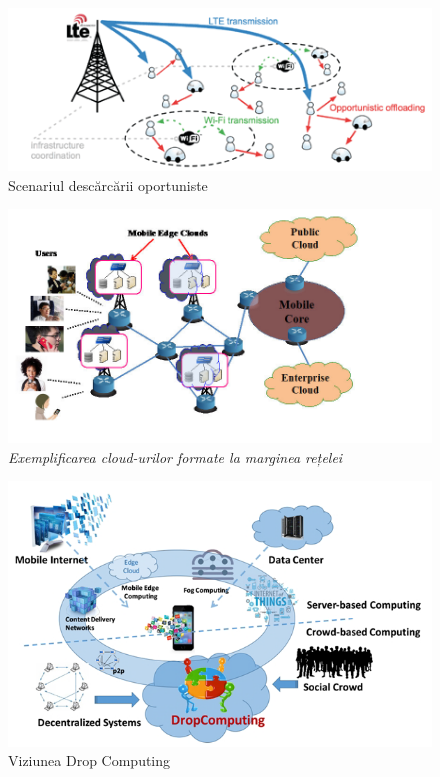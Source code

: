 \documentclass[12pt,a4paper]{report}
\begin{document}
\begin{figure}[th]
\centering
\includegraphics[width=6in]{pics/ONs.png}
  \caption{Scenariul descărcării oportuniste\protect\footnotemark}
  \label{fig:pic1}
\end{figure}

\begin{figure}[th]
\centering
\includegraphics[width=6in]{pics/mobile-edge-computing.jpg}
  \caption{\emph{Exemplificarea cloud-urilor formate la marginea rețelei}\protect\footnotemark}
  \label{fig:pic0}
\end{figure}

\begin{figure}[th]
\centering
\includegraphics[width=6in]{pics/dropComputing.png}
  \caption{Viziunea Drop Computing\protect\footnotemark}
  \label{fig:pic2}
\end{figure}
\end{document}
